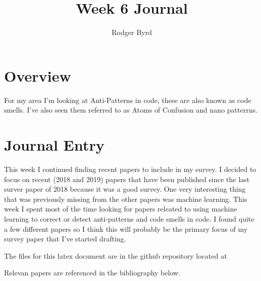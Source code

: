 \documentclass[conference]{IEEEtran}
\begin{document}

\title{Week 6 Journal}
\author{Rodger Byrd}
\maketitle


\section{Overview}
For my area I'm looking at Anti-Patterns in code, these are also known as code smells. I've also seen them referred to as Atoms of Confusion and nano patterrns.

\section{Journal Entry}
This week I continued finding recent papers to include in my survey. 
I decided to focus on recent (2018 and 2019) papers that have been published since the last surver paper of 2018 because it was a good survey.
One very interesting thing that was previously missing from the other papers was machine learning.
This week I spent most of the time looking for papers releated to using machine learning to correct or detect anti-patterns and code smells in code. 
I found quite a few different papers so I think this will probably be the primary focus of my survey paper that I've started drafting.

The files for this latex document are in the github repository located at 

Relevan papers are referenced in the bibliography below. 
\nocite{*}
\clearpage




\end{document}
